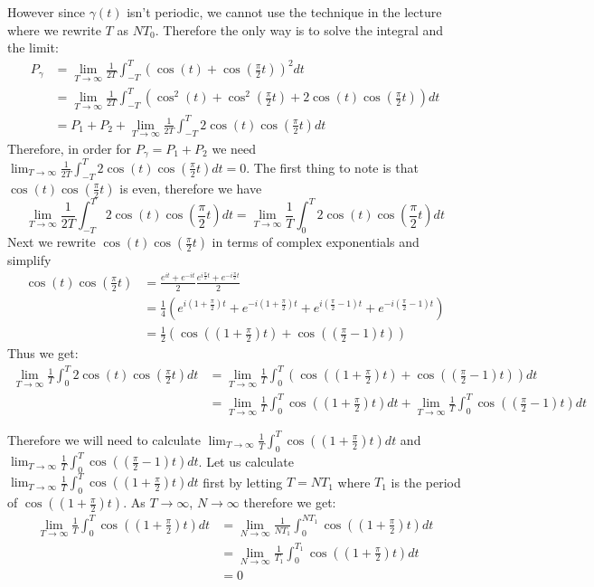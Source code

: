 \documentclass[12pt]{article}
\begin{document}
However since $\gamma(t)$ isn't periodic, we cannot use the technique in the lecture where we rewrite $T$ as $NT_0$. Therefore the only way is to solve the integral and the limit:
\begin{align*}
P_\gamma&=\lim_{T\to\infty}\frac{1}{2T}\int_{-T}^{T}(\cos(t)+\cos(\frac{\pi}{2}t))^2dt\\
&=\lim_{T\to\infty}\frac{1}{2T}\int_{-T}^{T}(\cos^2(t)+\cos^2(\frac{\pi}{2}t)+2\cos(t)\cos(\frac{\pi}{2}t))dt\\
&=P_1+P_2+\lim_{T\to\infty}\frac{1}{2T}\int_{-T}^{T}2\cos(t)\cos(\frac{\pi}{2}t)dt
\end{align*}
Therefore, in order for $P_\gamma=P_1+P_2$ we need $\lim_{T\to\infty}\frac{1}{2T}\int_{-T}^{T}2\cos(t)\cos(\frac{\pi}{2}t)dt=0$. The first thing to note is that $\cos(t)\cos(\frac{\pi}{2}t)$ is even, therefore we have
$$\lim_{T\to\infty}\frac{1}{2T}\int_{-T}^{T}2\cos(t)\cos(\frac{\pi}{2}t)dt=\lim_{T\to\infty}\frac{1}{T}\int_{0}^{T}2\cos(t)\cos(\frac{\pi}{2}t)dt$$
Next we rewrite $\cos(t)\cos(\frac{\pi}{2}t)$ in terms of complex exponentials and simplify
\begin{align*}
\cos(t)\cos(\frac{\pi}{2}t)&=\frac{e^{it}+e^{-it}}{2}\frac{e^{i\frac{\pi}{2}t}+e^{-i\frac{\pi}{2}t}}{2}\\
&=\frac{1}{4}(e^{i(1+\frac{\pi}{2})t}+e^{-i(1+\frac{\pi}{2})t}+e^{i(\frac{\pi}{2}-1)t}+e^{-i(\frac{\pi}{2}-1)t})\\
&=\frac{1}{2}(\cos((1+\frac{\pi}{2})t)+\cos((\frac{\pi}{2}-1)t))
\end{align*}
Thus we get:
\begin{align*}
\lim_{T\to\infty}\frac{1}{T}\int_{0}^{T}2\cos(t)\cos(\frac{\pi}{2}t)dt&=\lim_{T\to\infty}\frac{1}{T}\int_{0}^{T}(\cos((1+\frac{\pi}{2})t)+\cos((\frac{\pi}{2}-1)t))dt\\
&=\lim_{T\to\infty}\frac{1}{T}\int_{0}^{T}\cos((1+\frac{\pi}{2})t)dt+\lim_{T\to\infty}\frac{1}{T}\int_{0}^{T}\cos((\frac{\pi}{2}-1)t)dt
\end{align*}

Therefore we will need to calculate $\lim_{T\to\infty}\frac{1}{T}\int_{0}^{T}\cos((1+\frac{\pi}{2})t)dt$ and $\lim_{T\to\infty}\frac{1}{T}\int_{0}^{T}\cos((\frac{\pi}{2}-1)t)dt$. Let us calculate $\lim_{T\to\infty}\frac{1}{T}\int_{0}^{T}\cos((1+\frac{\pi}{2})t)dt$ first by letting $T=NT_1$ where $T_1$ is the period of $\cos((1+\frac{\pi}{2})t)$. As $T\to\infty$, $N\to\infty$ therefore we get:
\begin{align*}
\lim_{T\to\infty}\frac{1}{T}\int_{0}^{T}\cos((1+\frac{\pi}{2})t)dt&=\lim_{N\to\infty}\frac{1}{NT_1}\int_{0}^{NT_1}\cos((1+\frac{\pi}{2})t)dt\\
&=\lim_{N\to\infty}\frac{1}{T_1}\int_{0}^{T_1}\cos((1+\frac{\pi}{2})t)dt\\
&=0
\end{align*}
\end{document}

